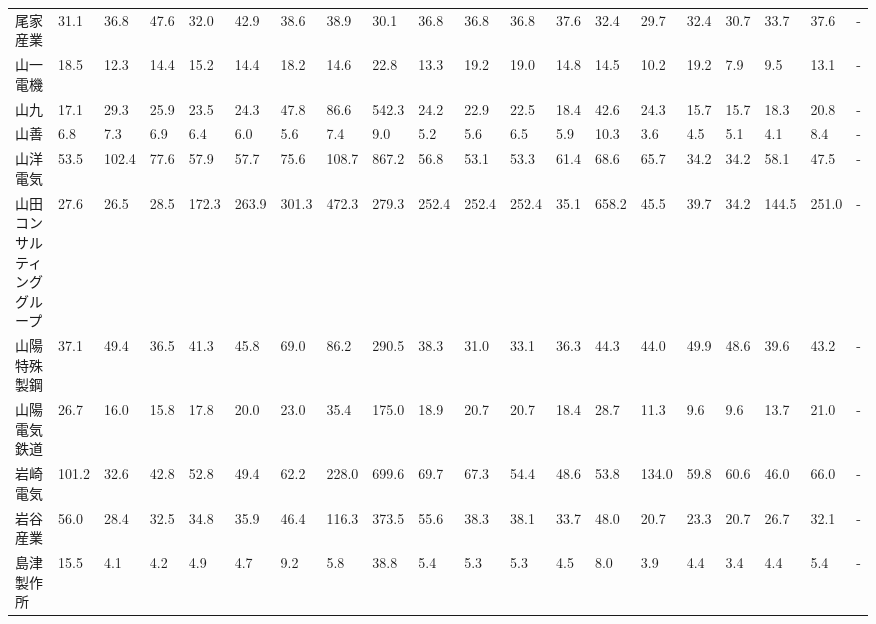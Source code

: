 \begin{longtable}[c]{lp{3mm}p{3mm}p{3mm}p{3mm}p{3mm}p{3mm}p{3mm}p{3mm}p{3mm}p{3mm}p{3mm}p{3mm}p{3mm}p{3mm}p{3mm}p{3mm}p{3mm}p{3mm}p{3mm}}
尾家産業            &   31.1 &   36.8 &      47.6 &      32.0 &       42.9 &    38.6 &    38.9 &     30.1 &    36.8 &    36.8 &   36.8 &   37.6 &    32.4 &    29.7 &    32.4 &   30.7 &   33.7 &    37.6 &      - \\
山一電機            &   18.5 &   12.3 &      14.4 &      15.2 &       14.4 &    18.2 &    14.6 &     22.8 &    13.3 &    19.2 &   19.0 &   14.8 &    14.5 &    10.2 &    19.2 &    7.9 &    9.5 &    13.1 &      - \\
山九              &   17.1 &   29.3 &      25.9 &      23.5 &       24.3 &    47.8 &    86.6 &    542.3 &    24.2 &    22.9 &   22.5 &   18.4 &    42.6 &    24.3 &    15.7 &   15.7 &   18.3 &    20.8 &      - \\
山善              &    6.8 &    7.3 &       6.9 &       6.4 &        6.0 &     5.6 &     7.4 &      9.0 &     5.2 &     5.6 &    6.5 &    5.9 &    10.3 &     3.6 &     4.5 &    5.1 &    4.1 &     8.4 &      - \\
山洋電気            &   53.5 &  102.4 &      77.6 &      57.9 &       57.7 &    75.6 &   108.7 &    867.2 &    56.8 &    53.1 &   53.3 &   61.4 &    68.6 &    65.7 &    34.2 &   34.2 &   58.1 &    47.5 &      - \\
山田コンサルティンググループ  &   27.6 &   26.5 &      28.5 &     172.3 &      263.9 &   301.3 &   472.3 &    279.3 &   252.4 &   252.4 &  252.4 &   35.1 &   658.2 &    45.5 &    39.7 &   34.2 &  144.5 &   251.0 &      - \\
山陽特殊製鋼          &   37.1 &   49.4 &      36.5 &      41.3 &       45.8 &    69.0 &    86.2 &    290.5 &    38.3 &    31.0 &   33.1 &   36.3 &    44.3 &    44.0 &    49.9 &   48.6 &   39.6 &    43.2 &      - \\
山陽電気鉄道          &   26.7 &   16.0 &      15.8 &      17.8 &       20.0 &    23.0 &    35.4 &    175.0 &    18.9 &    20.7 &   20.7 &   18.4 &    28.7 &    11.3 &     9.6 &    9.6 &   13.7 &    21.0 &      - \\
岩崎電気            &  101.2 &   32.6 &      42.8 &      52.8 &       49.4 &    62.2 &   228.0 &    699.6 &    69.7 &    67.3 &   54.4 &   48.6 &    53.8 &   134.0 &    59.8 &   60.6 &   46.0 &    66.0 &      - \\
岩谷産業            &   56.0 &   28.4 &      32.5 &      34.8 &       35.9 &    46.4 &   116.3 &    373.5 &    55.6 &    38.3 &   38.1 &   33.7 &    48.0 &    20.7 &    23.3 &   20.7 &   26.7 &    32.1 &      - \\
島津製作所           &   15.5 &    4.1 &       4.2 &       4.9 &        4.7 &     9.2 &     5.8 &     38.8 &     5.4 &     5.3 &    5.3 &    4.5 &     8.0 &     3.9 &     4.4 &    3.4 &    4.4 &     5.4 &      - \\

\end{longtable}
